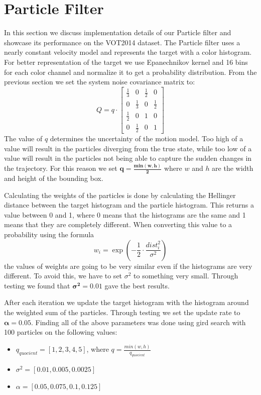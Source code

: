 \documentclass[9pt]{IEEEtran}
\begin{document}
\section{Particle Filter}
In this section we discuss implementation details of our Particle filter and showcase its performance on the VOT2014 dataset.
The Particle filter uses a nearly constant velocity model and represents the target with a color histogram.
For better representation of the target we use Epanechnikov kernel and 16 bins for each color channel and normalize it to get a probability distribution.
From the previous section we set the system noise covariance matrix to:
\begin {equation}
    Q = q \cdot 
    \begin{bmatrix}
    \frac{ 1}{3} & 0 & \frac{1}{2} & 0 \\
    0 & \frac{ 1}{3} & 0 & \frac{1}{2} \\
    \frac{ 1}{2} & 0 & 1 & 0 \\
    0 & \frac{ 1}{2} & 0 & 1
    \end{bmatrix}
\end{equation}
The value of $q$ determines the uncertainty of the motion model.
Too high of a value will result in the particles diverging from the true state, while too low of a value will result in the particles not being able to capture the sudden changes in the trajectory.
For this reason we set $\boldsymbol{q= \frac{min(w, h)}{2}}$ where $w$ and $h$ are the width and height of the bounding box.

Calculating the weights of the particles is done by calculating the Hellinger distance between the target histogram and the particle histogram.
This returns a value between 0 and 1, where 0 means that the histograms are the same and 1 means that they are completely different.
When converting this value to a probability using the formula 
\begin{equation}
    w_i = \exp(-\frac{1}{2} \cdot \frac{dist_i^2}{\sigma^2})
\end{equation}
the values of weights are going to be very similar even if the histograms are very different.
To avoid this, we have to set $\sigma^2$ to something very small.
Through testing we found that $\boldsymbol{\sigma^2 = 0.01}$ gave the best results.

After each iteration we update the target histogram with the histogram around the weighted sum of the particles.
Through testing we set the update rate to $\boldsymbol{\alpha = 0.05}$.
Finding all of the above parameters was done using gird search with 100 particles on the following values:
\begin{itemize}
    \item $q_{quocient} = [1, 2, 3, 4, 5]$, where $q = \frac{min(w, h)}{q_{quocient}}$
    \item $\sigma^2 = [0.01, 0.005, 0.0025]$
    \item $\alpha = [0.05, 0.075, 0.1, 0.125]$
\end{itemize}
\end{document}
